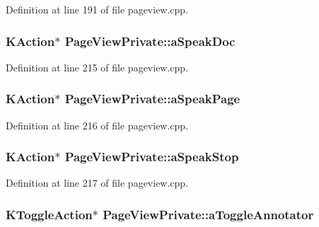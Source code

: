 Definition at line 191 of file pageview.\+cpp.

\hypertarget{classPageViewPrivate_ae017762cbf8b93ab294f647563d6ccf0}{
\subsubsection[{a\+Speak\+Doc}]{\setlength{\rightskip}{0pt plus 5cm}K\+Action$\ast$ Page\+View\+Private\+::a\+Speak\+Doc}}\label{classPageViewPrivate_ae017762cbf8b93ab294f647563d6ccf0}


Definition at line 215 of file pageview.\+cpp.

\hypertarget{classPageViewPrivate_abcf8673f8ee893b554984b46cc1b30d8}{
\subsubsection[{a\+Speak\+Page}]{\setlength{\rightskip}{0pt plus 5cm}K\+Action$\ast$ Page\+View\+Private\+::a\+Speak\+Page}}\label{classPageViewPrivate_abcf8673f8ee893b554984b46cc1b30d8}


Definition at line 216 of file pageview.\+cpp.

\hypertarget{classPageViewPrivate_ac0ad1db7d08f13202e952d1b0743a377}{
\subsubsection[{a\+Speak\+Stop}]{\setlength{\rightskip}{0pt plus 5cm}K\+Action$\ast$ Page\+View\+Private\+::a\+Speak\+Stop}}\label{classPageViewPrivate_ac0ad1db7d08f13202e952d1b0743a377}


Definition at line 217 of file pageview.\+cpp.

\hypertarget{classPageViewPrivate_a29f1ef25d86a534e1605ae5e662233b8}{
\subsubsection[{a\+Toggle\+Annotator}]{\setlength{\rightskip}{0pt plus 5cm}K\+Toggle\+Action$\ast$ Page\+View\+Private\+::a\+Toggle\+Annotator}}\label{classPageViewPrivate_a29f1ef25d86a534e1605ae5e662233b8}


